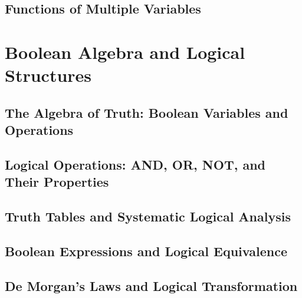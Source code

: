 \documentclass[12pt, oneside, openany]{book}
\let\oldchapter\chapter
\renewcommand{\chapter}{
	\cleardoublepage
	\thispagestyle{chapter}
	\oldchapter
}
\begin{document}
\section{Functions of Multiple Variables}


\chapter{Boolean Algebra and Logical Structures}

\section{The Algebra of Truth: Boolean Variables and Operations}

\section{Logical Operations: AND, OR, NOT, and Their Properties}

\section{Truth Tables and Systematic Logical Analysis}

\section{Boolean Expressions and Logical Equivalence}

\section{De Morgan's Laws and Logical Transformation}
\end{document}
